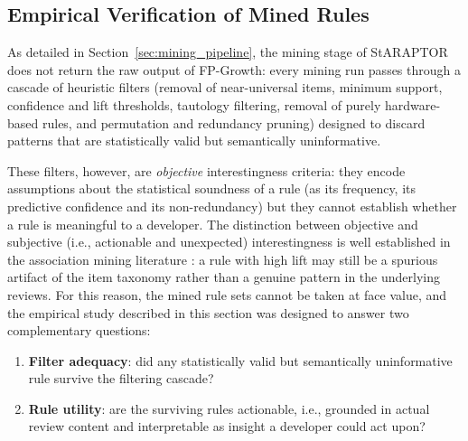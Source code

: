 \subsection{Empirical Verification of Mined Rules}
\label{subsec:rules_verification}

\noindent As detailed in Section~\ref{sec:mining_pipeline}, the mining stage of StARAPTOR does not return the raw output of FP-Growth: every mining run passes through a cascade of heuristic filters (removal of near-universal items, minimum support, confidence and lift thresholds, tautology filtering, removal of purely hardware-based rules, and permutation and redundancy pruning) designed to discard patterns that are statistically valid but semantically uninformative.

These filters, however, are \emph{objective} interestingness criteria: they encode assumptions about the statistical soundness of a rule (as its frequency, its predictive confidence and its non-redundancy) but they cannot establish whether a rule is meaningful to a developer. The distinction between objective and subjective (i.e., actionable and unexpected) interestingness is well established in the association mining literature \cite{eldin2026interestingness}: a rule with high lift may still be a spurious artifact of the item taxonomy rather than a genuine pattern in the underlying reviews. For this reason, the mined rule sets cannot be taken at face value, and the empirical study described in this section was designed to answer two complementary questions:

\begin{enumerate}
    \item \textbf{Filter adequacy}: did any statistically valid but semantically uninformative rule survive the filtering cascade?
    \item \textbf{Rule utility}: are the surviving rules actionable, i.e., grounded in actual review content and interpretable as insight a developer could act upon?
\end{enumerate}

